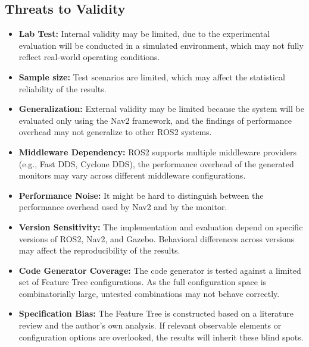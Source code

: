 \subsection{Threats to Validity}
\begin{itemize}[leftmargin=*]
    \item \textbf{Lab Test:} Internal validity may be limited, due to the experimental evaluation will be conducted in a simulated environment, which may not fully reflect real-world operating conditions.
    \item \textbf{Sample size:} Test scenarios are limited, which may affect the statistical reliability of the results.
    \item \textbf{Generalization:} External validity may be limited because the system will be evaluated only using the Nav2 framework, and the findings of performance overhead may not generalize to other ROS2 systems.
    \item \textbf{Middleware Dependency:} ROS2 supports multiple middleware providers (e.g., Fast DDS, Cyclone DDS), the performance overhead of the generated monitors may vary across different middleware configurations.
    \item \textbf{Performance Noise:} It might be hard to distinguish between the performance overhead used by Nav2 and by the monitor.
    \item \textbf{Version Sensitivity:} The implementation and evaluation depend on specific versions of ROS2, Nav2, and Gazebo. Behavioral differences across versions may affect the reproducibility of the results.
    \item \textbf{Code Generator Coverage:} The code generator is tested against a limited set of Feature Tree configurations. As the full configuration space is combinatorially large, untested combinations may not behave correctly.
    \item \textbf{Specification Bias:} The Feature Tree is constructed based on a literature review and the author's own analysis. If relevant observable elements or configuration options are overlooked, the results will inherit these blind spots.

\end{itemize}

